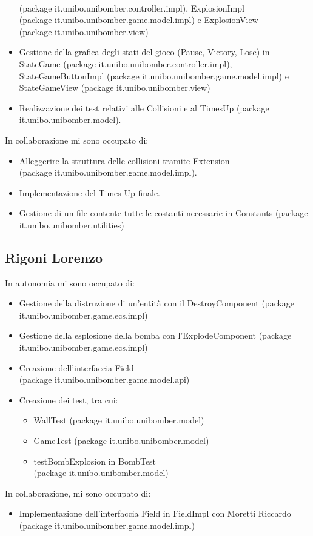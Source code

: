\documentclass[a4paper,12pt]{report}
\begin{document}
\begin{itemize}
    \\(package it.unibo.unibomber.controller.impl), ExplosionImpl 
    \\(package it.unibo.unibomber.game.model.impl) e ExplosionView 
    \\(package it.unibo.unibomber.view)
    \item Gestione della grafica degli stati del gioco (Pause, Victory, Lose) in StateGame (package it.unibo.unibomber.controller.impl), StateGameButtonImpl (package it.unibo.unibomber.game.model.impl) e StateGameView (package it.unibo.unibomber.view)
    \item Realizzazione dei test relativi alle Collisioni e al TimesUp  (package it.unibo.unibomber.model).
\end{itemize}
In collaborazione mi sono occupato di:
\begin{itemize}
    \item Alleggerire la struttura delle collisioni tramite Extension 
    \\(package it.unibo.unibomber.game.model.impl).
    \item Implementazione del Times Up finale.
    \item Gestione di un file contente tutte le costanti necessarie in Constants (package it.unibo.unibomber.utilities)
\end{itemize}


\subsection*{Rigoni Lorenzo}
In autonomia mi sono occupato di:
\begin{itemize}
    \item Gestione della distruzione di un’entità con il DestroyComponent (package it.unibo.unibomber.game.ecs.impl)
    \item Gestione della esplosione della bomba con l’ExplodeComponent (package it.unibo.unibomber.game.ecs.impl)
    \item Creazione dell’interfaccia Field
        \\(package it.unibo.unibomber.game.model.api)
    \item Creazione dei test, tra cui:
          \begin{itemize}
              \item WallTest (package it.unibo.unibomber.model)
              \item GameTest (package it.unibo.unibomber.model)
              \item testBombExplosion in BombTest 
              \\(package it.unibo.unibomber.model)
          \end{itemize}
\end{itemize}
In collaborazione, mi sono occupato di:
\begin{itemize}
    \item Implementazione dell’interfaccia Field in FieldImpl con Moretti Riccardo (package  it.unibo.unibomber.game.model.impl)
\end{itemize}
\end{document}
